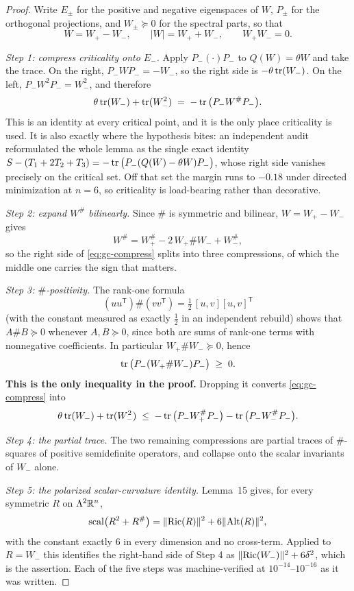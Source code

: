 \begin{proof}
Write $E_\pm$ for the positive and negative eigenspaces of $W$, $P_\pm$ for the orthogonal projections, and $W_\pm\succeq0$ for the spectral parts, so that
\[
W=W_+-W_-,\qquad |W|=W_++W_-,\qquad W_+W_-=0 .
\]

\emph{Step 1: compress criticality onto $E_-$.} Apply $P_-(\cdot)P_-$ to $Q(W)=\theta W$ and take the trace. On the right, $P_-WP_-=-W_-$, so the right side is $-\theta\operatorname{tr}(W_-)$. On the left, $P_-W^2P_-=W_-^2$, and therefore
\begin{equation}\label{eq:gc-compress}
\theta\tr(W_-)+\tr(W_-^2)\;=\;-\tr\big(P_-W^{\#}P_-\big).
\end{equation}
This is an identity at every critical point, and it is the only place criticality is used. It is also exactly where the hypothesis bites: an independent audit reformulated the whole lemma as the single exact identity $S-(T_1+2T_2+T_3)=-\operatorname{tr}\big(P_-(Q(W)-\theta W)P_-\big)$, whose right side vanishes precisely on the critical set. Off that set the margin runs to $-0.18$ under directed minimization at $n=6$, so criticality is load-bearing rather than decorative.

\emph{Step 2: expand $W^{\#}$ bilinearly.} Since $\#$ is symmetric and bilinear, $W=W_+-W_-$ gives
\[
W^{\#}=W_+^{\#}-2\,W_+\#W_-+W_-^{\#},
\]
so the right side of \eqref{eq:gc-compress} splits into three compressions, of which the middle one carries the sign that matters.

\emph{Step 3: $\#$-positivity.} The rank-one formula
\[
(uu^{\mathsf T})\#(vv^{\mathsf T})=\tfrac12\,[u,v][u,v]^{\mathsf T}
\]
(with the constant measured as exactly $\tfrac12$ in an independent rebuild) shows that $A\#B\succeq0$ whenever $A,B\succeq0$, since both are sums of rank-one terms with nonnegative coefficients. In particular $W_+\#W_-\succeq0$, hence
\[
\operatorname{tr}\big(P_-(W_+\#W_-)P_-\big)\;\ge\;0 .
\]
\textbf{This is the only inequality in the proof.} Dropping it converts \eqref{eq:gc-compress} into
\[
\theta\operatorname{tr}(W_-)+\operatorname{tr}(W_-^2)\;\le\;-\operatorname{tr}\big(P_-W_+^{\#}P_-\big)-\operatorname{tr}\big(P_-W_-^{\#}P_-\big).
\]

\emph{Step 4: the partial trace.} The two remaining compressions are partial traces of $\#$-squares of positive semidefinite operators, and collapse onto the scalar invariants of $W_-$ alone.

\emph{Step 5: the polarized scalar-curvature identity.} Lemma~15 gives, for every symmetric $R$ on $\Lambda^2\mathbb{R}^n$,
\[
\mathrm{scal}\big(R^2+R^{\#}\big)=\|\mathrm{Ric}(R)\|^2+6\|\mathrm{Alt}(R)\|^2 ,
\]
with the constant exactly $6$ in every dimension and no cross-term. Applied to $R=W_-$ this identifies the right-hand side of Step 4 as $\|\mathrm{Ric}(W_-)\|^2+6\delta^2$, which is the assertion. Each of the five steps was machine-verified at $10^{-14}$--$10^{-16}$ as it was written.


\end{proof}
